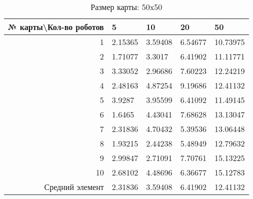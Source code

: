 \begin{table}[H]
\centering
\begin{tabular}{|r|l|l|l|l|}
\hline
№ карты\textbackslash Кол-во роботов & \textbf{5} & \textbf{10} & \textbf{20} & \textbf{50}\\ \hline
1 & 2.15365 & 3.59408 & 6.54677 & 10.73975\\ \hline
2 & 1.71077 & 3.3017 & 6.41902 & 11.11771\\ \hline
3 & 3.33052 & 2.96686 & 7.60223 & 12.24219\\ \hline
4 & 2.48163 & 4.87254 & 9.19686 & 12.41132\\ \hline
5 & 3.9287 & 3.95599 & 6.41092 & 11.49145\\ \hline
6 & 1.6465 & 4.43041 & 7.68628 & 13.13047\\ \hline
7 & 2.31836 & 4.70432 & 5.39536 & 13.06448\\ \hline
8 & 1.93215 & 2.44238 & 5.48949 & 12.79632\\ \hline
9 & 2.99847 & 2.71091 & 7.70761 & 15.13225\\ \hline
10 & 2.68102 & 4.48696 & 6.36677 & 15.12783\\ \hline
Средний элемент & 2.31836 & 3.59408 & 6.41902 & 12.41132\\ \hline
\end{tabular}
\caption*{Размер карты: 50x50}
\end{table}
